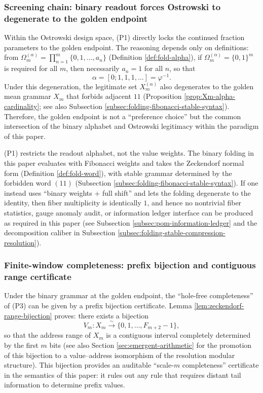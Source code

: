 \subsubsection{Screening chain: binary readout forces Ostrowski to degenerate to the golden endpoint}
Within the Ostrowski design space, (P1) directly locks the continued fraction parameters to the golden endpoint. The reasoning depends only on definitions: from \(\Omega_m^{(\alpha)}=\prod_{n=1}^{m}\{0,1,\dots,a_n\}\) (Definition \ref{def:fold-alpha}), if \(\Omega_m^{(\alpha)}=\{0,1\}^m\) is required for all \(m\), then necessarily \(a_n=1\) for all \(n\), so that
\[
\alpha=[0;1,1,1,\dots]=\varphi^{-1}.
\]
Under this degeneration, the legitimate set \(X_m^{(\alpha)}\) also degenerates to the golden mean grammar \(X_m\) that forbids adjacent \(11\) (Proposition \ref{prop:Xm-alpha-cardinality}; see also Subsection \ref{subsec:folding-fibonacci-stable-syntax}). Therefore, the golden endpoint is not a ``preference choice'' but the common intersection of the binary alphabet and Ostrowski legitimacy within the paradigm of this paper.

\begin{remark}\label{rem:protocol-binary-not-base2}
(P1) restricts the readout alphabet, not the value weights. The binary folding in this paper evaluates with Fibonacci weights and takes the Zeckendorf normal form (Definition \ref{def:fold-word}), with stable grammar determined by the forbidden word \((11)\) (Subsection \ref{subsec:folding-fibonacci-stable-syntax}). If one instead uses ``binary weights + full shift'' and lets the folding degenerate to the identity, then fiber multiplicity is identically \(1\), and hence no nontrivial fiber statistics, gauge anomaly audit, or information ledger interface can be produced as required in this paper (see Subsection \ref{subsec:pom-information-ledger} and the decomposition caliber in Subsection \ref{subsec:folding-stable-compression-resolution}).
\end{remark}

\subsubsection{Finite-window completeness: prefix bijection and contiguous range certificate}
Under the binary grammar at the golden endpoint, the ``hole-free completeness'' of (P3) can be given by a prefix bijection certificate. Lemma \ref{lem:zeckendorf-range-bijection} proves: there exists a bijection
\[
V_m:X_m\overset{\sim}{\longrightarrow}\{0,1,\dots,F_{m+2}-1\},
\]
so that the address range of \(X_m\) is a contiguous interval completely determined by the first \(m\) bits (see also Section \ref{sec:emergent-arithmetic} for the promotion of this bijection to a value--address isomorphism of the resolution modular structure). This bijection provides an auditable ``scale-\(m\) completeness'' certificate in the semantics of this paper: it rules out any rule that requires distant tail information to determine prefix values.

